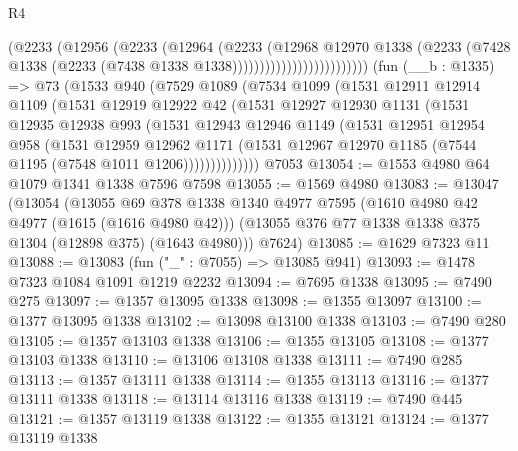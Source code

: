 \begin{lexlean}{R4}
\begin{coremodule}
                                  (@2233
                                    (@12956
                                      (@2233
                                        (@12964
                                          (@2233
                                            (@12968
                                              @12970
                                              @1338
                                              (@2233
                                                (@7428
                                                  @1338
                                                  (@2233 (@7438 @1338 @1338)))))))))))))))))))))))))
    (fun (__b : @1335) =>
    @73
      (@1533
        @940
        (@7529
          @1089
          (@7534
            @1099
            (@1531
              @12911
              @12914
              @1109
              (@1531
                @12919
                @12922
                @42
                (@1531
                  @12927
                  @12930
                  @1131
                  (@1531
                    @12935
                    @12938
                    @993
                    (@1531
                      @12943
                      @12946
                      @1149
                      (@1531
                        @12951
                        @12954
                        @958
                        (@1531
                          @12959
                          @12962
                          @1171
                          (@1531 @12967 @12970 @1185 (@7544 @1195 (@7548 @1011 @1206))))))))))))))
    @7053
@13054 := @1553 @4980 @64 @1079 @1341 @1338 @7596 @7598
@13055 := @1569 @4980
@13083 := @13047
    (@13054
      (@13055
        @69
        @378
        @1338
        @1340
        @4977
        @7595
        (@1610 @4980 @42 @4977 (@1615 (@1616 @4980 @42)))
        (@13055 @376 @77 @1338 @1338 @375 @1304 (@12898 @375) (@1643 @4980)))
      @7624)
@13085 := @1629 @7323 @11
@13088 := @13083 (fun ("_" : @7055) => @13085 @941)
@13093 := @1478 @7323 @1084 @1091 @1219 @2232
@13094 := @7695 @1338
@13095 := @7490 @275
@13097 := @1357 @13095 @1338
@13098 := @1355 @13097
@13100 := @1377 @13095 @1338
@13102 := @13098 @13100 @1338
@13103 := @7490 @280
@13105 := @1357 @13103 @1338
@13106 := @1355 @13105
@13108 := @1377 @13103 @1338
@13110 := @13106 @13108 @1338
@13111 := @7490 @285
@13113 := @1357 @13111 @1338
@13114 := @1355 @13113
@13116 := @1377 @13111 @1338
@13118 := @13114 @13116 @1338
@13119 := @7490 @445
@13121 := @1357 @13119 @1338
@13122 := @1355 @13121
@13124 := @1377 @13119 @1338

\end{coremodule}
\end{lexlean}
